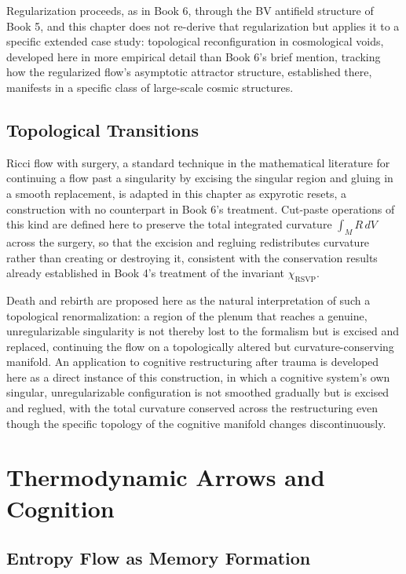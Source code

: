 Regularization proceeds, as in Book 6, through the BV antifield structure of Book 5, and this chapter does not re-derive that regularization but applies it to a specific extended case study: topological reconfiguration in cosmological voids, developed here in more empirical detail than Book 6's brief mention, tracking how the regularized flow's asymptotic attractor structure, established there, manifests in a specific class of large-scale cosmic structures.

\chapter{Topological Transitions}

Ricci flow with surgery, a standard technique in the mathematical literature for continuing a flow past a singularity by excising the singular region and gluing in a smooth replacement, is adapted in this chapter as expyrotic resets, a construction with no counterpart in Book 6's treatment. Cut-paste operations of this kind are defined here to preserve the total integrated curvature $\int_M R\, dV$ across the surgery, so that the excision and regluing redistributes curvature rather than creating or destroying it, consistent with the conservation results already established in Book 4's treatment of the invariant $\chi_{\mathrm{RSVP}}$.

Death and rebirth are proposed here as the natural interpretation of such a topological renormalization: a region of the plenum that reaches a genuine, unregularizable singularity is not thereby lost to the formalism but is excised and replaced, continuing the flow on a topologically altered but curvature-conserving manifold. An application to cognitive restructuring after trauma is developed here as a direct instance of this construction, in which a cognitive system's own singular, unregularizable configuration is not smoothed gradually but is excised and reglued, with the total curvature conserved across the restructuring even though the specific topology of the cognitive manifold changes discontinuously.

\part{Thermodynamic Arrows and Cognition}

\chapter{Entropy Flow as Memory Formation}

